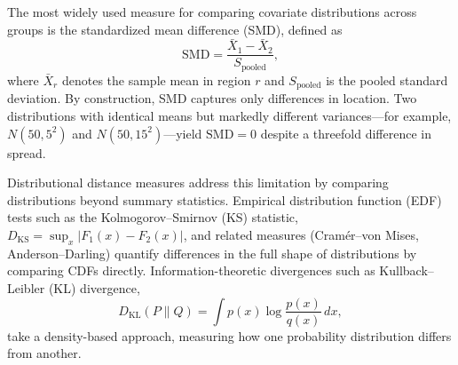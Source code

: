 \documentclass[AMA,Times1COL]{WileyNJDv5}
\begin{document}
The most widely used measure for comparing covariate distributions across groups is the standardized mean difference (SMD), defined as
\begin{equation}
\text{SMD} = \frac{\bar{X}_1 - \bar{X}_2}{S_{\text{pooled}}},
\label{eq:smd}
\end{equation}
where $\bar{X}_r$ denotes the sample mean in region $r$ and $S_{\text{pooled}}$ is the pooled standard deviation.\cite{austin2011} By construction, SMD captures only differences in location. Two distributions with identical means but markedly different variances---for example, $N(50, 5^2)$ and $N(50, 15^2)$---yield $\text{SMD} = 0$ despite a threefold difference in spread.

Distributional distance measures address this limitation by comparing distributions beyond summary statistics. Empirical distribution function (EDF) tests such as the Kolmogorov--Smirnov (KS) statistic, $D_{\text{KS}} = \sup_x |F_1(x) - F_2(x)|$, and related measures (Cram\'{e}r--von Mises, Anderson--Darling) quantify differences in the full shape of distributions by comparing CDFs directly. Information-theoretic divergences such as Kullback--Leibler (KL) divergence,
\begin{equation}
D_{\text{KL}}(P \| Q) = \int p(x) \log \frac{p(x)}{q(x)} \, dx,
\label{eq:kl}
\end{equation}
take a density-based approach, measuring how one probability distribution differs from another.
\end{document}
